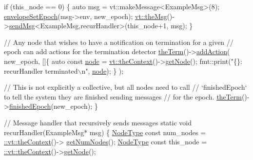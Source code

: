 \begin{DoxyCodeInclude}
  \textcolor{keywordflow}{if} (this\_node == 0) \{
    \textcolor{keyword}{auto} msg = vt::makeMessage<ExampleMsg>(8);
    \hyperlink{namespacevt_a4a0a9928690206b588dbcac2afb71088}{envelopeSetEpoch}(msg->env, new\_epoch);
    \hyperlink{namespacevt_aeafd31f866aeb4dc6fc2f6ee97136350}{vt::theMsg}()->\hyperlink{group__preregister_ga0162a39473e7f9b490a79a7983d949ac}{sendMsg}<ExampleMsg,recurHandler>(this\_node+1, msg);
  \}

  \textcolor{comment}{// Any node that wishes to have a notification on termination for a given}
  \textcolor{comment}{// epoch can add actions for the termination detector}
  \hyperlink{namespacevt_a127580fdfcaba0b4171e5c48c5676733}{theTerm}()->\hyperlink{structvt_1_1term_1_1_term_action_a1227042cb4eb38937fb8ed34bcbdf998}{addAction}(
    new\_epoch, []\{
      \textcolor{keyword}{auto} \textcolor{keyword}{const} \hyperlink{namespacevt_1_1config_a46e57c33bee1b9f1fa95455af86d80e0a576033c81e2ddd03d721ecef3b1b3f81}{node} = \hyperlink{namespacevt_a26551fe0e6e6a1371111df5b12c7e92c}{vt::theContext}()->\hyperlink{structvt_1_1ctx_1_1_context_a0d52c263ce8516546a67443d9a86fa5f}{getNode}();
      fmt::print(\textcolor{stringliteral}{"\{\}: recurHandler terminated\(\backslash\)n"}, \hyperlink{namespacevt_1_1config_a46e57c33bee1b9f1fa95455af86d80e0a576033c81e2ddd03d721ecef3b1b3f81}{node});
    \}
  );

  \textcolor{comment}{// This is not explicitly a collective, but all nodes need to call}
  \textcolor{comment}{// `finishedEpoch` to tell the system they are finished sending messages}
  \textcolor{comment}{// for the epoch.}
  \hyperlink{namespacevt_a127580fdfcaba0b4171e5c48c5676733}{theTerm}()->\hyperlink{structvt_1_1term_1_1_termination_detector_ad54d75c50bd3f34f30247817737bc303}{finishedEpoch}(new\_epoch);
\}

\textcolor{comment}{// Message handler that recursively sends messages}
\textcolor{keyword}{static} \textcolor{keywordtype}{void} recurHandler(ExampleMsg* msg) \{
  \hyperlink{namespacevt_a866da9d0efc19c0a1ce79e9e492f47e2}{NodeType} \textcolor{keyword}{const} num\_nodes = \hyperlink{namespacevt_a26551fe0e6e6a1371111df5b12c7e92c}{::vt::theContext}()->
      \hyperlink{structvt_1_1ctx_1_1_context_a7f41071aadf6d5fa9e1b6c703c5ff19d}{getNumNodes}();
  \hyperlink{namespacevt_a866da9d0efc19c0a1ce79e9e492f47e2}{NodeType} \textcolor{keyword}{const} this\_node = \hyperlink{namespacevt_a26551fe0e6e6a1371111df5b12c7e92c}{::vt::theContext}()->\hyperlink{structvt_1_1ctx_1_1_context_a0d52c263ce8516546a67443d9a86fa5f}{getNode}();


\end{DoxyCodeInclude}
